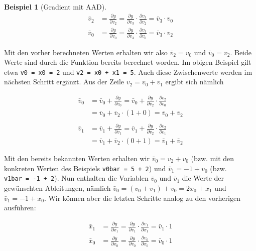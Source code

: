 \documentclass[
  a4paper,
  DIV=11]{scrreprt}
\theoremstyle{definition}
\theoremstyle{definition}
\newtheorem{example}{Beispiel}[chapter]
\theoremstyle{remark}
\begin{document}
\begin{example}[Gradient mit
AAD]
\begin{align*}
    \bar v_2 &= \frac{\partial y}{\partial v_2} = \frac{\partial y}{\partial v_3} \cdot \frac{\partial v_3}{\partial v_2} = \bar v_3 \cdot v_0 \\

    \bar v_0 &= \frac{\partial y}{\partial v_0} = \frac{\partial y}{\partial v_3} \cdot \frac{\partial v_3}{\partial v_0} = \bar v_3 \cdot v_2 
\end{align*}

Mit den vorher berechneten Werten erhalten wir also \(\bar v_2 = v_0\)
und \(\bar v_0 = v_2\). Beide Werte sind durch die Funktion bereits
berechnet worden. Im obigen Beispiel gilt etwa \texttt{v0\ =\ x0\ =\ 2}
und \texttt{v2\ =\ x0\ +\ x1\ =\ 5}. Auch diese Zwischenwerte werden im
nächsten Schritt ergänzt. Aus der Zeile \(v_2 = v_0 + v_1\) ergibt sich
nämlich

\begin{align*}
    \bar v_0 &= \bar v_0 + \frac{\partial y}{\partial v_0} = \bar v_0 + \frac{\partial y}{\partial v_2} \cdot \frac{\partial v_2}{\partial v_0} \\
    &= \bar v_0 + \bar v_2 \cdot (1+0) = \bar v_0 + \bar v_2 \\ & \\

    \bar v_1 &= \bar v_1 + \frac{\partial y}{\partial v_1} = \bar v_1 + \frac{\partial y}{\partial v_2} \cdot \frac{\partial v_2}{\partial v_1} \\
    &= \bar v_1 + \bar v_2 \cdot (0+1) = \bar v_1 + \bar v_2
\end{align*}

Mit den bereits bekannten Werten erhalten wir \(\bar v_0 = v_2 + v_0\)
(bzw. mit den konkreten Werten des Beispiels \texttt{v0bar\ =\ 5\ +\ 2})
und \(\bar v_1 = -1 + v_0\) (bzw. \texttt{v1bar\ =\ -1\ +\ 2}). Nun
enthalten die Variablen \(\bar v_0\) und \(\bar v_1\) die Werte der
gewünschten Ableitungen, nämlich
\(\bar v_0 = (v_0 + v_1) + v_0 = 2x_0 + x_1\) und
\(\bar v_1 = -1 + x_0\). Wir können aber die letzten Schritte analog zu
den vorherigen ausführen:

\begin{align*}
    \bar x_1 &= \frac{\partial y}{\partial x_1} = \frac{\partial y}{\partial v_1} \cdot \frac{\partial v_1}{\partial x_1} = \bar v_1 \cdot 1  \\

    \bar x_0 &= \frac{\partial y}{\partial x_0} = \frac{\partial y}{\partial v_0} \cdot \frac{\partial v_0}{\partial x_0} = \bar v_0 \cdot 1  \\
\end{align*}


\end{example}
\end{document}
